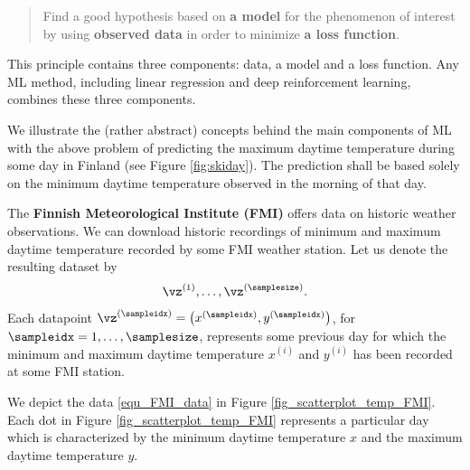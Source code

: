 \documentclass[12pt]{report}
\begin{document}
\begin{quote}
Find a good hypothesis based on {\bf a model} for the phenomenon of interest by 
using {\bf observed data} in order to minimize {\bf a loss function}. 
\end{quote}

This principle contains three components: data, a model and a 
loss function. Any ML method, including linear 
regression and deep reinforcement learning, combines these 
three components.  

We illustrate the (rather abstract) concepts behind the main 
components of ML with the above problem of predicting the 
maximum daytime temperature during some day in Finland (see Figure \ref{fig:skiday}). 
The prediction shall be based solely on the minimum daytime 
temperature observed in the morning of that day. 

The {\bf Finnish Meteorological Institute (FMI)} offers data 
on historic weather observations. We can download historic 
recordings of minimum and maximum daytime temperature 
recorded by some FMI weather station. Let us denote the 
resulting dataset by 
\begin{equation}
\label{equ_FMI_data}
\vz^{(1)},\ldots,\vz^{(\samplesize)}.  
\end{equation} 
Each datapoint $\vz^{(\sampleidx)} = \big(x^{(\sampleidx)},y^{(\sampleidx)}\big)$, 
for $\sampleidx=1,\ldots,\samplesize$, represents some previous 
day for which the minimum and maximum daytime temperature 
$x^{(i)}$ and $y^{(i)}$ has been recorded at some FMI station.  %

We depict the data \eqref{equ_FMI_data} in Figure \ref{fig_scatterplot_temp_FMI}.  
Each dot in Figure \ref{fig_scatterplot_temp_FMI} represents a 
particular day which is characterized by the minimum daytime 
temperature $x$ and the maximum daytime temperature $y$. 
\end{document}
